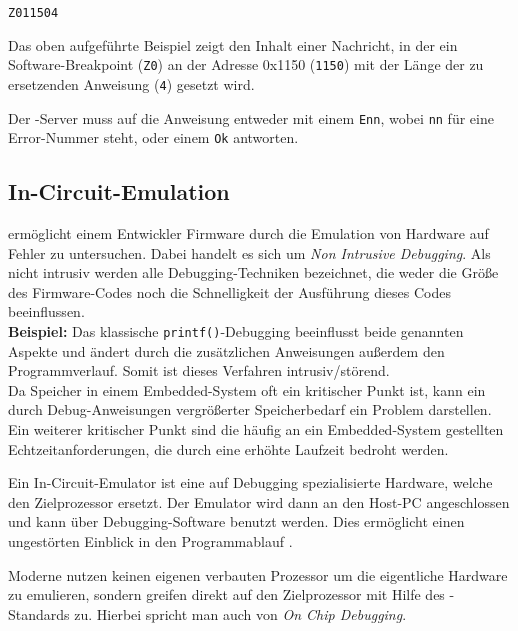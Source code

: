     \begin{Verbatim}[frame=single]
Z011504
    \end{Verbatim}

    Das oben aufgeführte Beispiel zeigt den Inhalt einer Nachricht, in der ein Software\hyp{}Breakpoint (\texttt{Z0}) an der
    Adresse 0x1150 (\texttt{1150}) mit der Länge der zu ersetzenden Anweisung (\texttt{4}) gesetzt wird.

    Der -Server muss auf die Anweisung entweder mit einem \texttt{Enn}, wobei \texttt{nn} für eine Error-Nummer
    steht, oder einem \texttt{Ok} antworten.

    \subsection{In-Circuit-Emulation}
    \label{sec:ice}
         ermöglicht einem Entwickler Firmware durch die Emulation von Hardware auf Fehler zu untersuchen. Dabei
        handelt es sich um \textit{Non Intrusive Debugging}. Als  nicht intrusiv werden alle Debugging-Techniken
        bezeichnet, die weder die Größe des Firmware-Codes noch die Schnelligkeit der Ausführung dieses Codes beeinflussen.\\
        \textbf{Beispiel:} Das klassische \texttt{printf()}-Debugging beeinflusst beide genannten Aspekte und ändert
        durch die zusätzlichen Anweisungen außerdem den Programmverlauf. Somit ist dieses Verfahren intrusiv/störend.
        \\

        Da Speicher in einem Embedded\hyp{}System oft ein kritischer Punkt ist, kann ein durch Debug\hyp{}Anweisungen vergrößerter
        Speicherbedarf ein Problem darstellen.
        Ein weiterer kritischer Punkt sind die häufig an ein Embedded-System gestellten Echtzeitanforderungen, die
        durch eine erhöhte Laufzeit bedroht werden.

        Ein In-Circuit-Emulator ist eine auf Debugging spezialisierte Hardware, welche den Zielprozessor ersetzt.
        Der Emulator wird dann an den Host-PC angeschlossen und kann über Debugging-Software benutzt werden. Dies
        ermöglicht einen ungestörten Einblick in den Programmablauf
        \citep[vgl.~Kap.~1.1]{Rath2005}.

        Moderne  nutzen keinen eigenen verbauten Prozessor um die eigentliche Hardware zu emulieren, sondern greifen
        direkt auf den Zielprozessor mit Hilfe des -Standards zu. Hierbei spricht man auch von
        \textit{On Chip Debugging}.

